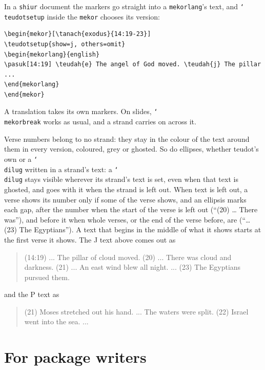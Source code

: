 \documentclass[11pt]{article}
\newcommand{\cs}[1]{\texttt{\char`\\#1}}
\begin{document}
In a \texttt{shiur} document the markers go straight into a \texttt{mekorlang}'s text, and
\cs{teudotsetup} inside the \texttt{mekor} chooses its version:
\begin{Verbatim}
\begin{mekor}[\tanach{exodus}{14:19-23}]
\teudotsetup{show=j, others=omit}
\begin{mekorlang}{english}
\pasuk[14:19] \teudah{e} The angel of God moved. \teudah{j} The pillar ...
\end{mekorlang}
\end{mekor}
\end{Verbatim}
A translation takes its own markers. On slides, \cs{mekorbreak} works as usual, and a strand
carries on across it.

Verse numbers belong to no strand: they stay in the colour of the text around them in every
version, coloured, grey or ghosted. So do ellipses, whether teudot's own or a \cs{dilug} written
in a strand's text: a \cs{dilug} stays visible wherever its strand's text is set, even when that text is ghosted,
and goes with it when the strand is left out. When text is left out, a verse shows its number only if
some of the verse shows, and an ellipsis marks each gap, after the number when the start of the
verse is left out (``(20) \ldots{} There was''), and before it when whole verses, or the end of
the verse before, are (``\ldots{} (23) The Egyptians''). A text that begins in the middle of
what it shows starts at the first verse it shows. The J text above comes out as
\begin{quote}
(14:19) ... The pillar of cloud moved. (20) ... There was cloud and darkness. (21) ... An east
wind blew all night. ... (23) The Egyptians pursued them.
\end{quote}
and the P text as
\begin{quote}
(21) Moses stretched out his hand. ... The waters were split. (22) Israel went into the sea.
...
\end{quote}

\section{For package writers}
\end{document}
